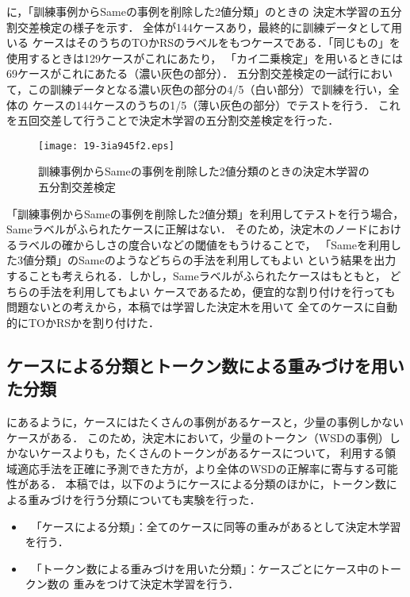 \documentclass[japanese]{jnlp_1.4}
\newcommand{\figref}[1]{}
\newcommand{\tabref}[1]{}
\begin{document}
\figref{fig:three}に，「訓練事例からSameの事例を削除した2値分類」のときの
決定木学習の五分割交差検定の様子を示す．
全体が144ケースあり，最終的に訓練データとして用いる
ケースはそのうちのTOかRSのラベルをもつケースである．「同じもの」を使用するときは129ケースがこれにあたり，
「カイ二乗検定」を用いるときには69ケースがこれにあたる（濃い灰色の部分）．
五分割交差検定の一試行において，この訓練データとなる濃い灰色の部分の4/5（白い部分）で訓練を行い，全体の
ケースの144ケースのうちの1/5（薄い灰色の部分）でテストを行う．
これを五回交差して行うことで決定木学習の五分割交差検定を行った．

\begin{figure}[t]
 \begin{center}
  \texttt{[image: 19-3ia945f2.eps]}
  \end{center}
 \caption{訓練事例からSameの事例を削除した2値分類のときの決定木学習の五分割交差検定}
 \label{fig:three}
\end{figure}

「訓練事例からSameの事例を削除した2値分類」を利用してテストを行う場合，
Sameラベルがふられたケースに正解はない．
そのため，決定木のノードにおけるラベルの確からしさの度合いなどの閾値をもうけることで，
「Sameを利用した3値分類」のSameのようなどちらの手法を利用してもよい
という結果を出力することも考えられる．しかし，Sameラベルがふられたケースはもともと，
どちらの手法を利用してもよい
ケースであるため，便宜的な割り付けを行っても問題ないとの考えから，本稿では学習した決定木を用いて
全てのケースに自動的にTOかRSかを割り付けた．


\subsection{ケースによる分類とトークン数による重みづけを用いた分類}
\label{sec:ケースによる分類とトークン数による重みづけを用いた分類}

\tabref{tab:table1}にあるように，ケースにはたくさんの事例があるケースと，少量の事例しかないケースがある．
このため，決定木において，少量のトークン（WSDの事例）しかないケースよりも，たくさんのトークンがあるケースについて，
利用する領域適応手法を正確に予測できた方が，より全体のWSDの正解率に寄与する可能性がある．
本稿では，以下のようにケースによる分類のほかに，トークン数による重みづけを行う分類についても実験を行った．


\begin{itemize}
\item\ 「ケースによる分類」：全てのケースに同等の重みがあるとして決定木学習を行う．
\item\ 「トークン数による重みづけを用いた分類」：ケースごとにケース中のトークン数の
重みをつけて決定木学習を行う．
\end{itemize}
\end{document}
